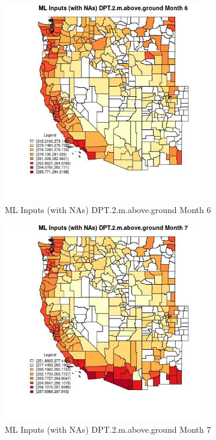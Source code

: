 \begin{figure} 
\centering  
\includegraphics[width=0.77\textwidth]{Code_Outputs/Report_ML_input_PM25_Step4_part_f_de_duplicated_aves_prioritize_24hr_obswNAs_CountyDPT2mabovegroundmedianMonth6.jpg} 
\caption{\label{fig:Report_ML_input_PM25_Step4_part_f_de_duplicated_aves_prioritize_24hr_obswNAsCountyDPT2mabovegroundmedianMonth6}ML Inputs (with NAs) DPT.2.m.above.ground Month 6} 
\end{figure} 
 

\begin{figure} 
\centering  
\includegraphics[width=0.77\textwidth]{Code_Outputs/Report_ML_input_PM25_Step4_part_f_de_duplicated_aves_prioritize_24hr_obswNAs_CountyDPT2mabovegroundmedianMonth7.jpg} 
\caption{\label{fig:Report_ML_input_PM25_Step4_part_f_de_duplicated_aves_prioritize_24hr_obswNAsCountyDPT2mabovegroundmedianMonth7}ML Inputs (with NAs) DPT.2.m.above.ground Month 7} 
\end{figure} 
 

